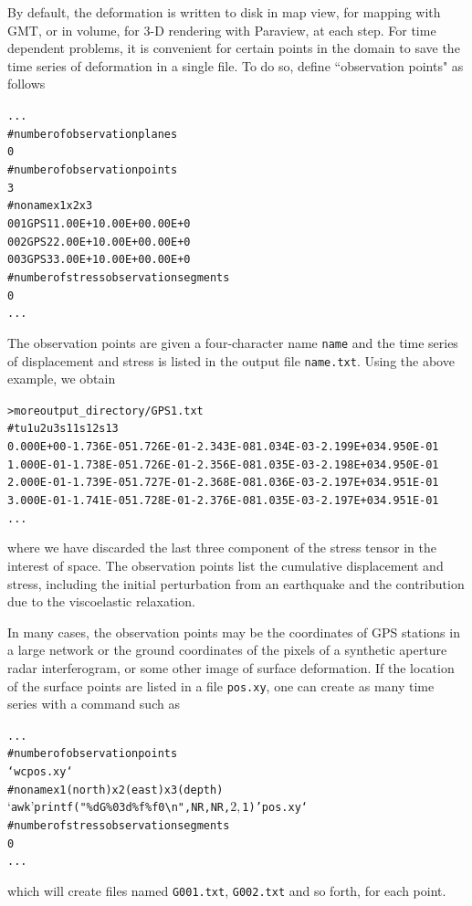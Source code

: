 \documentclass[10pt]{article}
\begin{document}
By default, the deformation is written to disk in map view, for mapping with GMT, or in volume, for 3-D rendering with Paraview, at each step. For time dependent problems, it is convenient for certain points in the domain to save the time series of deformation in a single file. To do so, define ``observation points" as follows
\begin{alltt}
...
# number of observation planes
0
# number of observation points
{\color{NavyBlue}3}
# no name       x1       x2       x3
{\color{NavyBlue} 001 GPS1  1.00E+1  0.00E+0  0.00E+0
 002 GPS2  2.00E+1  0.00E+0  0.00E+0
 003 GPS3  3.00E+1  0.00E+0  0.00E+0}
# number of stress observation segments
0
...
\end{alltt}
The observation points are given a four-character name \verb'name' and the time series of displacement and stress is listed in the output file \verb'name.txt'. Using the above example, we obtain
\begin{alltt}
> more output_directory/GPS1.txt
#         t         u1        u2         u3       s11        s12       s13
  0.000E+00 -1.736E-05 1.726E-01 -2.343E-08 1.034E-03 -2.199E+03 4.950E-01
  1.000E-01 -1.738E-05 1.726E-01 -2.356E-08 1.035E-03 -2.198E+03 4.950E-01
  2.000E-01 -1.739E-05 1.727E-01 -2.368E-08 1.036E-03 -2.197E+03 4.951E-01
  3.000E-01 -1.741E-05 1.728E-01 -2.376E-08 1.035E-03 -2.197E+03 4.951E-01
...
\end{alltt}
where we have discarded the last three component of the stress tensor in the interest of space. The observation points list the cumulative displacement and stress, including the initial perturbation from an earthquake and the contribution due to the viscoelastic relaxation.


In many cases, the observation points may be the coordinates of GPS stations in a large network or the ground coordinates of the pixels of a synthetic aperture radar interferogram, or some other image of surface deformation. If the location of the surface points are listed in a file \verb'pos.xy', one can create as many time series with a command such as
\begin{alltt}
...
# number of observation points
{\color{NavyBlue}`wc pos.xy`}
# no name       x1(north)       x2(east)       x3(depth)
{\color{NavyBlue}`awk '{\textbraceleft}printf("\%d G\%03d \%f \%f 0{\textbackslash}n",NR,NR,$2,$1){\textbraceright}' pos.xy`}
# number of stress observation segments
0
...
\end{alltt}
which will create files named \verb'G001.txt', \verb'G002.txt' and so forth, for each point.
\end{document}
